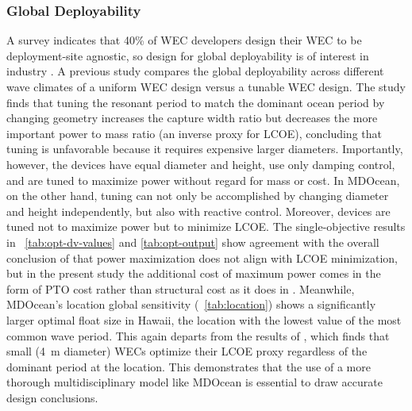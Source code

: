 \subsubsection{Global Deployability}
A survey indicates that 40\% of WEC developers design their WEC to be deployment-site agnostic, so design for global deployability is of interest in industry \cite{trueworthy_wave_2020}.
A previous study \cite{de_andres_adaptability_2015} compares the global deployability across different wave climates of a uniform WEC design versus a tunable WEC design.
The study finds that tuning the resonant period to match the dominant ocean period by changing geometry increases the capture width ratio but decreases the more important power to mass ratio (an inverse proxy for LCOE), concluding that tuning is unfavorable because it requires expensive larger diameters.
Importantly, however, the devices have equal diameter and height, use only damping control, and are tuned to maximize power without regard for mass or cost.
In MDOcean, on the other hand, tuning can not only be accomplished by changing diameter and height independently, but also with reactive control.
Moreover, devices are tuned not to maximize power but to minimize LCOE.
The single-objective results in \tableautorefname~\ref{tab:opt-dv-values} and \ref{tab:opt-output} show agreement with the overall conclusion of \cite{de_andres_adaptability_2015} that power maximization does not align with LCOE minimization, but in the present study the additional cost of maximum power comes in the form of PTO cost rather than structural cost as it does in \cite{de_andres_adaptability_2015}.
Meanwhile, MDOcean's location global sensitivity (\tableautorefname~\ref{tab:location}) shows a significantly larger optimal float size in Hawaii, the location with the lowest value of the most common wave period.
This again departs from the results of \cite{de_andres_adaptability_2015}, which finds that small (4~m diameter) WECs optimize their LCOE proxy regardless of the dominant period at the location.
This demonstrates that the use of a more thorough multidisciplinary model like MDOcean is essential to draw accurate design conclusions.

